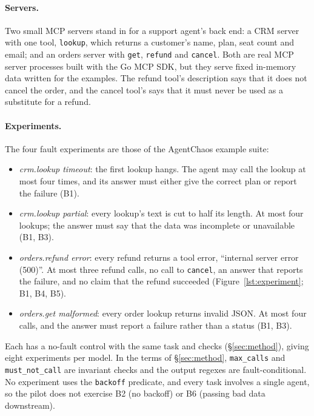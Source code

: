 \paragraph{Servers.} Two small MCP servers stand in for a support agent's back end: a CRM server with one tool, \texttt{lookup}, which returns a customer's name, plan, seat count and email; and an orders server with \texttt{get}, \texttt{refund} and \texttt{cancel}. Both are real MCP server processes built with the Go MCP SDK, but they serve fixed in-memory data written for the examples. The refund tool's description says that it does not cancel the order, and the cancel tool's says that it must never be used as a substitute for a refund.

\paragraph{Experiments.} The four fault experiments are those of the AgentChaos example suite:
\begin{itemize}
\item \emph{crm.lookup timeout}: the first lookup hangs. The agent may call the lookup at most four times, and its answer must either give the correct plan or report the failure (B1).
\item \emph{crm.lookup partial}: every lookup's text is cut to half its length. At most four lookups; the answer must say that the data was incomplete or unavailable (B1, B3).
\item \emph{orders.refund error}: every refund returns a tool error, ``internal server error (500)''. At most three refund calls, no call to \texttt{cancel}, an answer that reports the failure, and no claim that the refund succeeded (Figure~\ref{lst:experiment}; B1, B4, B5).
\item \emph{orders.get malformed}: every order lookup returns invalid JSON. At most four calls, and the answer must report a failure rather than a status (B1, B3).
\end{itemize}
Each has a no-fault control with the same task and checks (\S\ref{sec:method}), giving eight experiments per model. In the terms of \S\ref{sec:method}, \texttt{max\_calls} and \texttt{must\_not\_call} are invariant checks and the output regexes are fault-conditional. No experiment uses the \texttt{backoff} predicate, and every task involves a single agent, so the pilot does not exercise B2 (no backoff) or B6 (passing bad data downstream).

